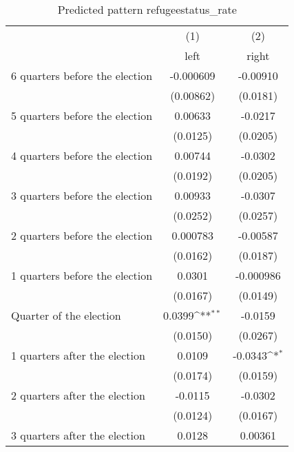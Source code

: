 \begin{table}[htbp]\centering
\def\sym#1{\ifmmode^{#1}\else\(^{#1}\)\fi}
\caption{Predicted pattern refugeestatus\_rate}
\begin{tabular}{l*{2}{c}}
\hline\hline
                    &\multicolumn{1}{c}{(1)}&\multicolumn{1}{c}{(2)}\\
                    &\multicolumn{1}{c}{left}&\multicolumn{1}{c}{right}\\
\hline
 6 quarters before the election&   -0.000609         &    -0.00910         \\
                    &   (0.00862)         &    (0.0181)         \\
[1em]
 5 quarters before the election&     0.00633         &     -0.0217         \\
                    &    (0.0125)         &    (0.0205)         \\
[1em]
 4 quarters before the election&     0.00744         &     -0.0302         \\
                    &    (0.0192)         &    (0.0205)         \\
[1em]
 3 quarters before the election&     0.00933         &     -0.0307         \\
                    &    (0.0252)         &    (0.0257)         \\
[1em]
 2 quarters before the election&    0.000783         &    -0.00587         \\
                    &    (0.0162)         &    (0.0187)         \\
[1em]
 1 quarters before the election&      0.0301         &   -0.000986         \\
                    &    (0.0167)         &    (0.0149)         \\
[1em]
Quarter of the election&      0.0399\sym{**} &     -0.0159         \\
                    &    (0.0150)         &    (0.0267)         \\
[1em]
 1 quarters after the election&      0.0109         &     -0.0343\sym{*}  \\
                    &    (0.0174)         &    (0.0159)         \\
[1em]
 2 quarters after the election&     -0.0115         &     -0.0302         \\
                    &    (0.0124)         &    (0.0167)         \\
[1em]
 3 quarters after the election&      0.0128         &     0.00361         \\

\end{tabular}
\end{table}
